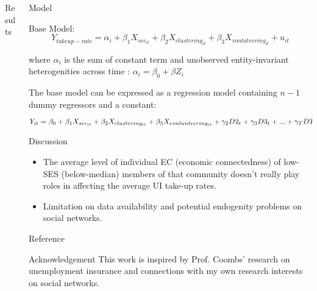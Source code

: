 \documentclass[xcolor=dvipsnames]{beamer} %
\begin{document}
\begin{frame}{}
\begin{columns}[t]
\begin{column}{.3\linewidth}
\begin{block}{\LARGE Results}
    \end{block}


  \end{column}
  \begin{column}{.3\linewidth}
   


    \begin{block}{\LARGE Model}

Base Model:
$$Y_{\overline{takeup-rate}}=\alpha_i+\beta_1 X_{sec_{it}}+\beta_2 X_{clustering_{it}}+\beta_3 X_{vonluteering_{it}}+u_{it}$$

where $\alpha_i$ is the sum of constant term and unobserved entity-invariant heterogenities across time : $\alpha_i=\beta_0+\beta Z_i$
\vspace{0.2in}

The base model can be expressed as a regression model containing $n-1$ dummy regressors and a constant:

$$Y_{it}=\beta_0+\beta_1 X_{sec_{it}}+\beta_2 X_{clustering_{it}}+\beta_3 X_{vonlunteering_{it}} \\+\gamma_2 D2_t+\gamma_3 D3_t +...+\gamma_T DT_t+\mu_{it}$$
    \end{block}

\begin{block}{\LARGE Discussion}
\begin{itemize}
    \item The average level of individual EC (economic connectedness) of low-SES (below-median) members of that community doesn't really play roles in affecting the average UI take-up rates.
    
    \item Limitation on data availability and potential endogenity problems on social networks.  
\end{itemize}

\end{block}

\begin{block}{\LARGE Reference}
\printbibliography
    
\end{block}

\begin{block} {\LARGE Acknowledgement}
This work is inspired by Prof. Coombs' research on unemployment insurance and connections with my own research interests on social networks.


\end{block}
\end{column}
\end{columns}
\end{frame}
\end{document}
